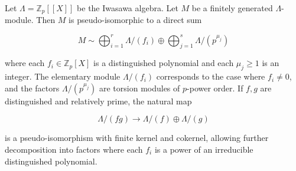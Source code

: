 Let $\Lambda = \mathbb{Z}_p[[X]]$ be the Iwasawa algebra. Let $M$ be a finitely generated $\Lambda$-module. Then $M$ is pseudo-isomorphic to a direct sum

$$
M \sim \bigoplus_{i=1}^{r} \Lambda / (f_i) \oplus \bigoplus_{j=1}^{s} \Lambda / (p^{\mu_j})
$$

where each $f_i \in \mathbb{Z}_p[X]$ is a distinguished polynomial and each $\mu_j \geq 1$ is an integer. The elementary module $\Lambda/(f_i)$ corresponds to the case where $f_i \neq 0$, and the factors $\Lambda/(p^{\mu_j})$ are torsion modules of $p$-power order. If $f, g$ are distinguished and relatively prime, the natural map

$$
\Lambda/(fg) \to \Lambda/(f) \oplus \Lambda/(g)
$$

is a pseudo-isomorphism with finite kernel and cokernel, allowing further decomposition into factors where each $f_i$ is a power of an irreducible distinguished polynomial.
